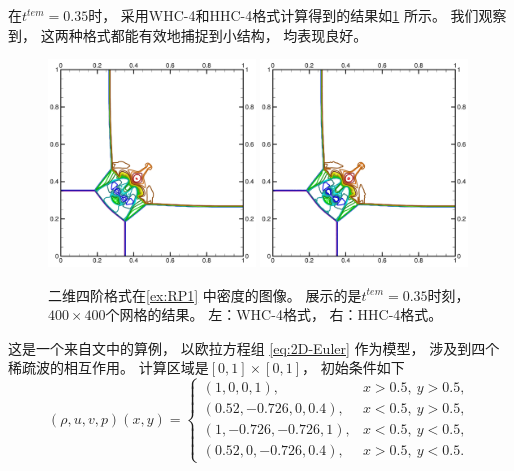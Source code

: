 在$t^{tem}=0.35$时，
采用WHC-4和HHC-4格式计算得到的结果如\cref{fig:RP1} 所示。
我们观察到，
这两种格式都能有效地捕捉到小结构，
均表现良好。

\begin{figure}[htbp]
  \centering
  \includegraphics[width=0.49\textwidth]{fig/2D/RP1_S2O4-WHC4_CFL0.600000.pdf}
  \includegraphics[width=0.49\textwidth]{fig/2D/RP1_S2O4-HHC4theta20_CFL0.600000.pdf}
  \caption{二维四阶格式在\cref{ex:RP1} 中密度的图像。
    展示的是$t^{tem}=0.35$时刻，
    \\$400 \times 400$个网格的结果。
    左：WHC-4格式，
    右：HHC-4格式。
  }
  \label{fig:RP1}
\end{figure}

\begin{example}[二维欧拉方程组的黎曼问题2]
  \label{ex:RP2}
  这是一个来自文\cite{RPexample}中的算例，
  以欧拉方程组 \cref{eq:2D-Euler} 作为模型，
  涉及到四个稀疏波的相互作用。
  计算区域是$[0,1]\times[0,1]$，
  初始条件如下
  \begin{equation}
    (\rho, u, v, p) (x, y)=
    \begin{cases}
      (1, 0, 0, 1),           & x>0.5,~y>0.5,  \\
      (0.52, -0.726, 0, 0.4), & x<0.5,~y>0.5,  \\
      (1, -0.726, -0.726, 1), & x<0.5,~y<0.5,  \\
      (0.52, 0, -0.726, 0.4), & x>0.5,~y<0.5.
    \end{cases}
  \end{equation}
\end{example}

